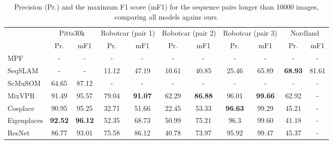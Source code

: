 \begin{table}[t]
\centering
\caption{Precision (Pr.) and the maximum F1 score (mF1) for the sequence pairs longer than 10000 images, comparing all models agains ours. }
\label{tab:precision_mf1_long}
\begin{tabular}{lcccccccccc}
\hline
                        & \multicolumn{2}{c}{Pitts30k} & \multicolumn{2}{c}{Robotcar (pair 1)} & \multicolumn{2}{c}{Robotcar (pair 2)} & \multicolumn{2}{c}{Robotcar (pair 3)} & \multicolumn{2}{c}{Nordland} \\             \cmidrule(lr){2-3} \cmidrule(lr){4-5} \cmidrule(lr){6-7} \cmidrule(lr){8-9}\cmidrule(lr){10-11}  
                        & Pr.           & mF1          & Pr.               & mF1               & Pr.               & mF1               & Pr.               & mF1               & Pr.           & mF1          \\ \hline
MPF                     & -             & -            & -                 & -                 & -                 & -                 & -                 & -                 & -             & -            \\
SeqSLAM                 & -             & -            & 11.12             & 47.19             & 10.61             & 40.85             & 25.46             & 65.89             & \textbf{68.93}             & 81.61 \\
ScMuSOM                 & 64.65         & 87.12        & -                 & -                 & -                 & -                 & -                 & -                 & -             & -            \\
MixVPR                  & 91.49         & 95.57        & 79.04             & \textbf{91.07}             & 62.29             & \textbf{86.88}     & 96.01             &    \textbf{99.66}    & 62.92         & -            \\
Cosplace                & 90.95         & 95.25        & 32.71             & 51.66             & 22.45             &   53.33                 & \textbf{96.63}             &   99.29   & 45.21         & -            \\
Eigenplaces             & \textbf{92.52}& \textbf{96.12}& 52.35             & 68.73               & 50.99          &   75.21       & 96.3              &    99.60    & 41.18         & -            \\
ResNet                  & 86.77         & 93.01        & 75.58             & 86.12             & 40.78             &   73.97       & 95.92             &     99.47  & 45.37         & -            \\

\end{tabular}
\end{table}
